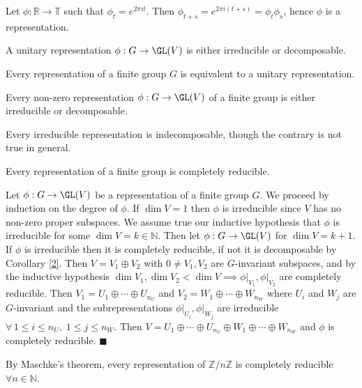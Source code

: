 \documentclass[../Project.tex]{subfiles}
\begin{document}
\begin{exam}[\cite{1}]
	Let $\phi : \mathbb{R} \to \mathbb{T}$ such that $\phi_t = e^{2 \pi i t}$. Then $\phi_{t+s} = e^{2 \pi i (t+s)} = \phi_t\phi_s$, hence $\phi$ is a representation.
\end{exam}

\begin{prop}[\cite {1}]
	A unitary representation $\phi : G \to \GL(V)$ is either irreducible or decomposable.
\end{prop}

\begin{prop}[\cite {1}]
	Every representation of a finite group $G$ is equivalent to a unitary representation.
\end{prop}

\begin{coro}[\cite{1}]
\label{2}
	Every  non-zero representation $\phi : G \to \GL(V)$ of a finite group is either irreducible or decomposable.
\end{coro}

\begin{prop}[\cite {1}]
	Every irreducible representation is indecomposable, though the contrary is not true in general.
\end{prop}

\begin{theo}
	Every representation of a finite group is completely reducible. \label{4}
\end{theo}
\begin{proo*}[\cite{1}]
	Let $\phi : G \to \GL(V)$ be a representation of a finite group $G$. We proceed by induction on the degree of $\phi$. If $\dim V = 1$ then $\phi$ is irreducible since $V$ has no non-zero proper subspaces. We assume true our inductive hypothesis that $\phi$ is irreducible for some $\dim V = k \in \mathbb{N}$. Then let $\phi : G \to \GL(V)$ for $\dim V = k +1$. If $\phi$ is irreducible then it is completely reducible, if not it is decomposable by Corollary \ref{2}. Then $V = V_1 \oplus V_2$ with $0 \neq V_1,V_2$ are $G$-invariant subspaces, and by the inductive hypothesis $\dim V_1,\dim V_2 < \dim V \implies \phi\vert_{V_1},\phi\vert_{V_2}$ are completely reducible. Then $V_1 = U_1 \oplus \cdots \oplus U_{n_U}$ and $V_2 = W_1 \oplus \cdots \oplus W_{n_W}$ where $U_i$ and $W_j$ are $G$-invariant and the subrepresentations $\phi\vert_{U_i},\phi\vert_{W_j}$ are irreducible $\forall\, 1 \leqslant i \leqslant n_U,\;1\leqslant j \leqslant n_W$. Then $V = U_1 \oplus \cdots \oplus U_{n_U} \oplus W_1 \oplus \cdots \oplus W_{n_W}$ and $\phi$ is completely reducible. $\blacksquare$
\end{proo*}

\begin{exam}
	By Maschke's theorem, every representation of $\mathbb{Z}/n\mathbb{Z}$ is completely reducible $\forall n \in \mathbb{N}$.
\end{exam}
\end{document}
